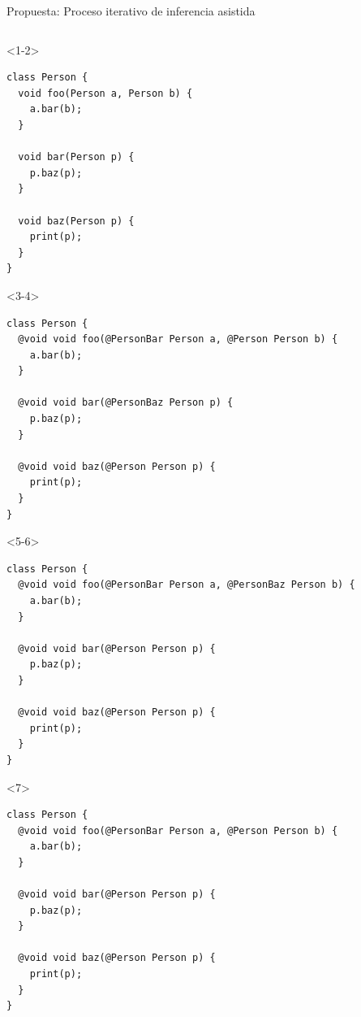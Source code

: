 \documentclass[aspectratio=169,10pt]{beamer}
\begin{document}
\begin{frame}[fragile]{Propuesta: Proceso iterativo de inferencia asistida}

    \begin{columns}
      \begin{column}{0.5\textwidth}
				\begin{onlyenv}<1-2>
					\only<2-|handout:0>{\stepcounter{framenumber}}
    \begin{lstlisting}
class Person {
  void foo(Person a, Person b) {
    a.bar(b);
  }

  void bar(Person p) {
    p.baz(p);
  }

  void baz(Person p) {
    print(p);
  }
}
\end{lstlisting}
\end{onlyenv}
\begin{onlyenv}<3-4>
\begin{lstlisting}
class Person {
  @void void foo(@PersonBar Person a, @Person Person b) {
    a.bar(b);
  }

  @void void bar(@PersonBaz Person p) {
    p.baz(p);
  }

  @void void baz(@Person Person p) {
    print(p);
  }
}
\end{lstlisting}
\end{onlyenv}
\begin{onlyenv}<5-6>
\begin{lstlisting}
class Person {
  @void void foo(@PersonBar Person a, @PersonBaz Person b) {
    a.bar(b);
  }

  @void void bar(@Person Person p) {
    p.baz(p);
  }

  @void void baz(@Person Person p) {
    print(p);
  }
}
\end{lstlisting}
\end{onlyenv}
\begin{onlyenv}<7>
\begin{lstlisting}
class Person {
  @void void foo(@PersonBar Person a, @Person Person b) {
    a.bar(b);
  }

  @void void bar(@Person Person p) {
    p.baz(p);
  }

  @void void baz(@Person Person p) {
    print(p);
  }
}
\end{lstlisting}
\end{onlyenv}
      \end{column}


\end{columns}
\end{frame}
\end{document}
